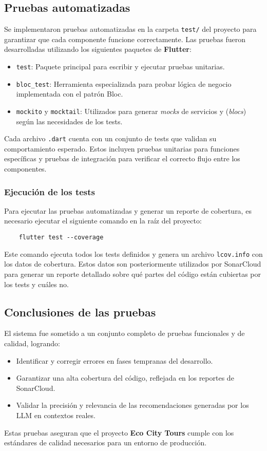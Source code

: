 \subsection{Pruebas automatizadas}

Se implementaron pruebas automatizadas en la carpeta \texttt{test/} del proyecto para garantizar que cada componente funcione correctamente. Las pruebas fueron desarrolladas utilizando los siguientes paquetes de \textbf{Flutter}:

\begin{itemize}
	\item \texttt{test}: Paquete principal para escribir y ejecutar pruebas unitarias.
	\item \texttt{bloc\_test}: Herramienta especializada para probar lógica de negocio implementada con el patrón Bloc.
	\item \texttt{mockito} y \texttt{mocktail}: Utilizados para generar \textit{mocks} de servicios y (\textit{blocs}) según las necesidades de los tests.
\end{itemize}

Cada archivo \texttt{.dart} cuenta con un conjunto de tests que validan su comportamiento esperado. Estos incluyen pruebas unitarias para funciones específicas y pruebas de integración para verificar el correcto flujo entre los componentes.

\subsubsection{Ejecución de los tests}

Para ejecutar las pruebas automatizadas y generar un reporte de cobertura, es necesario ejecutar el siguiente comando en la raíz del proyecto:
\begin{verbatim}
	flutter test --coverage
\end{verbatim}

Este comando ejecuta todos los tests definidos y genera un archivo \texttt{lcov.info} con los datos de cobertura. Estos datos son posteriormente utilizados por SonarCloud para generar un reporte detallado sobre qué partes del código están cubiertas por los tests y cuáles no.
\subsection{Conclusiones de las pruebas}

El sistema fue sometido a un conjunto completo de pruebas funcionales y de calidad, logrando:
\begin{itemize}
	\item Identificar y corregir errores en fases tempranas del desarrollo.
	\item Garantizar una alta cobertura del código, reflejada en los reportes de SonarCloud.
	\item Validar la precisión y relevancia de las recomendaciones generadas por los LLM en contextos reales.
\end{itemize}

Estas pruebas aseguran que el proyecto \textbf{Eco City Tours} cumple con los estándares de calidad necesarios para un entorno de producción.
